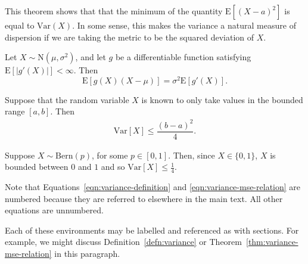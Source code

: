 \begin{remark}
    This theorem shows that that the minimum of the quantity
    $\mathrm{E}[(X - a)^2]$ is equal to $\mathrm{Var}(X)$.
    In some sense, this makes the variance a natural measure of dispersion if 
    we are taking the metric to be the squared deviation of $X$.
\end{remark}


\begin{lemma}
    Let $X \sim \mathrm{N}(\mu, \sigma^2)$, and let $g$ be a differentiable 
    function satisfying $\mathrm{E}[|g'(X)|] < \infty$. Then
    \begin{equation}
        \mathrm{E}[g(X)(X-\mu)] = \sigma^2 \mathrm{E}[g'(X)].
        \nonumber
    \end{equation}
\end{lemma}

\begin{proposition}
    Suppose that the random variable $X$ is known to only take values in the 
    bounded range $[a, b]$. Then  
    \begin{align}
        \mathrm{Var}[X] \leq \dfrac{(b-a)^2}{4}.
        \nonumber
    \end{align}
\end{proposition}

\begin{example}
    Suppose $X \sim \mathrm{Bern} (p)$, for some $p \in [0,1]$. Then, 
    since $X \in \{0, 1\}$, $X$ is bounded between $0$ and $1$ and so
    $\mathrm{Var}[X] \leq \tfrac{1}{4}$.
\end{example}

Note that Equations~\eqref{eqn:variance-definition} and \eqref{eqn:variance-mse-relation} are numbered because they are referred to elsewhere in the main text. All other equations are unnumbered. 

Each of these environments may be labelled and referenced as with sections. For example, we might discuss Definition~\ref{defn:variance} or Theorem~\ref{thm:variance-mse-relation} in this paragraph. 
